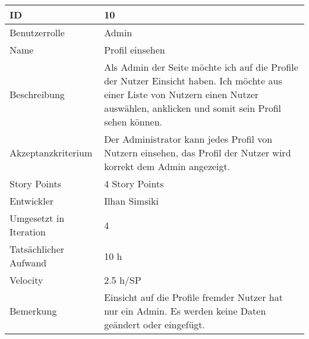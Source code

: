 \begin{tabularx}{\textwidth}{|p{}|X|}
	\hline
	ID & 10\\
	\hline
	Benutzerrolle & Admin\\
	\hline
	Name & Profil einsehen\\
	\hline
	Beschreibung & Als Admin der Seite möchte ich auf die Profile der Nutzer Einsicht haben. Ich möchte aus einer Liste von Nutzern einen Nutzer auswählen, anklicken und somit sein Profil sehen können. \\
	\hline
	Akzeptanzkriterium & Der Administrator kann jedes Profil von Nutzern einsehen, das Profil der Nutzer wird korrekt dem Admin angezeigt.\\
	\hline
	Story Points & 4 Story Points\\
	\hline
	Entwickler & Ilhan Simsiki\\
	\hline
	Umgesetzt in Iteration & 4\\
	\hline
	Tatsächlicher Aufwand & 10 h\\
	\hline
	Velocity & 2.5 h/SP\\
	\hline
	Bemerkung & Einsicht auf die Profile fremder Nutzer hat nur ein Admin. Es werden keine Daten geändert oder eingefügt.\\
	\hline
\end{tabularx}
\vspace{20pt}
